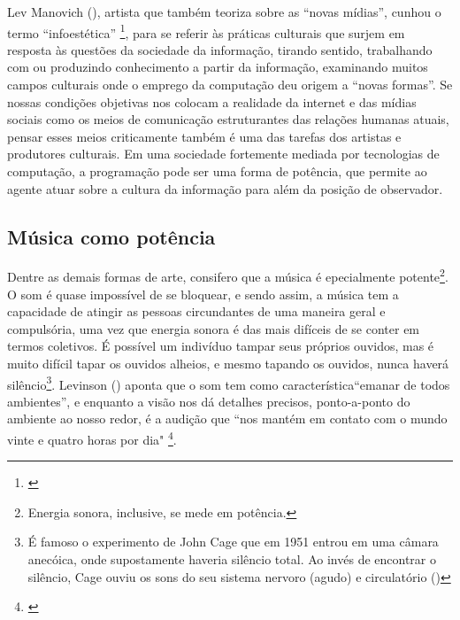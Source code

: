  Lev Manovich (\citeyear{Manovich2008}), artista que também teoriza sobre as ``novas mídias'', cunhou o termo ``infoestética'' \footnote{\cite{Manovich2008}}, para se referir às práticas culturais que surjem em resposta às questões da sociedade da informação, tirando sentido, trabalhando com ou produzindo conhecimento a partir da informação, examinando muitos campos culturais onde o emprego da computação deu origem a ``novas formas''. Se nossas condições objetivas nos colocam a realidade da internet e das mídias sociais como os meios de comunicação estruturantes das relações humanas atuais, pensar esses meios criticamente também é uma das tarefas dos artistas e produtores culturais. Em uma sociedade fortemente mediada por tecnologias de computação, a programação pode ser uma forma de potência, que permite ao agente atuar sobre a cultura da informação para além da posição de observador.

\subsection{Música como potência}
Dentre as demais formas de arte, consifero que a música é epecialmente potente\footnote{Energia sonora, inclusive, se mede em potência.}. O som é quase impossível de se bloquear, e sendo assim, a música tem a capacidade de atingir as pessoas circundantes de uma maneira geral e compulsória, uma vez que energia sonora é das mais difíceis de se conter em termos coletivos. É possível um indivíduo tampar seus próprios ouvidos, mas é muito difícil tapar os ouvidos alheios, e mesmo tapando os ouvidos, nunca haverá silêncio\footnote{É famoso o experimento de John Cage que em 1951 entrou em uma câmara anecóica, onde supostamente haveria silêncio total. Ao invés de encontrar o silêncio, Cage ouviu os sons do seu sistema nervoro (agudo) e circulatório (\cite{Mauceri1997})}. Levinson (\citeyear{Levinson2001}) aponta que o som tem como característica``emanar de todos ambientes'', e enquanto a visão nos dá detalhes precisos, ponto-a-ponto do ambiente ao nosso redor, é a audição que ``nos mantém em contato com o mundo vinte e quatro horas por dia" \footnote{\cite[47]{Levinson2001}}.  


 

